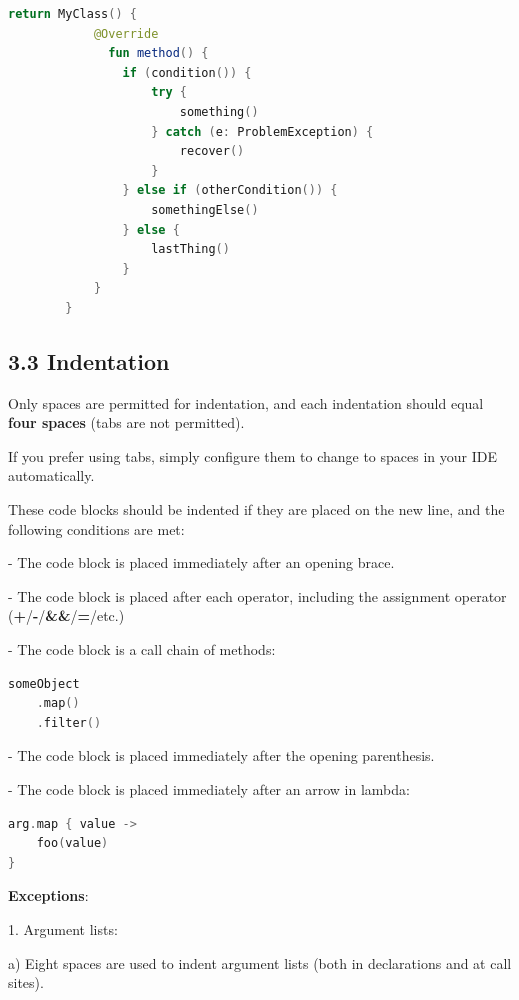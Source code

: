 {{{{{{{{{{{{{{{{\begin{lstlisting}[language=Kotlin]
        return MyClass() {
            @Override
              fun method() {
                if (condition()) {
                    try {
                        something()
                    } catch (e: ProblemException) {
                        recover()
                    }
                } else if (otherCondition()) {
                    somethingElse()
                } else {
                    lastThing()
                }
            }
        }
\end{lstlisting}


\subsection*{\textbf{3.3 Indentation}}

\label{sec:3.3}



Only spaces are permitted for indentation, and each indentation should equal \textbf{four spaces} (tabs are not permitted).

If you prefer using tabs, simply configure them to change to spaces in your IDE automatically.

These code blocks should be indented if they are placed on the new line, and the following conditions are met:

-	The code block is placed immediately after an opening brace.

-	The code block is placed after each operator, including the assignment operator (\textbf{+}/\textbf{-}/\textbf{\&\&}/\textbf{=}/etc.)

-	The code block is a call chain of methods:

\begin{lstlisting}[language=Kotlin]
someObject
    .map()
    .filter()
\end{lstlisting}
-  The code block is placed immediately after the opening parenthesis.

-  The code block is placed immediately after an arrow in lambda:



\begin{lstlisting}[language=Kotlin]
arg.map { value ->
    foo(value)
}
\end{lstlisting}
    

\textbf{Exceptions}:

1.	Argument lists: \

a) Eight spaces are used to indent argument lists (both in declarations and at call sites). \

}}}}}}}}}}}}}}}}
